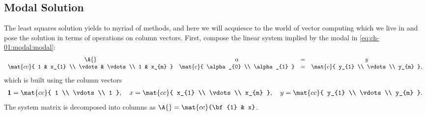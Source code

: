 
 
\subsection{\label{ssec:modal solution}Modal Solution}  
The least squares solution yields to myriad of methods, and here we will acquiesce to the world of vector computing which we live in and pose the solution in terms of operations on column vectors.
%
First, compose the linear system implied by the modal in \eqref{eq:ch-01:modal:modal}:
%
\begin{equation}
	\begin{array}{cccc}
		\A{} & \alpha & = & y \\
		\mat{cc}{ 1 & x_{1} \\ \vdots & \vdots \\ 1 & x_{m} } &
		\mat{c}{ \alpha_{0} \\ \alpha_{1} } &
			= &
		\mat{c}{ y_{1} \\ \vdots \\ y_{m} } ,
	\end{array}
\label{eq:modalls}
\end{equation}
%
which is built using the column vectors
%
\begin{equation*}
	\begin{split}
		{\bf{1}} = \mat{cc}{ 1 \\ \vdots \\ 1 }, \quad
		x = \mat{cc}{ x_{1} \\ \vdots \\ x_{m} }, \quad
		y = \mat{cc}{ y_{1} \\ \vdots \\ y_{m} } .
	\end{split}
\end{equation*}
%
The system matrix is decomposed into columns as $\A{} = \mat{cc}{\bf{1} & x}$. 

